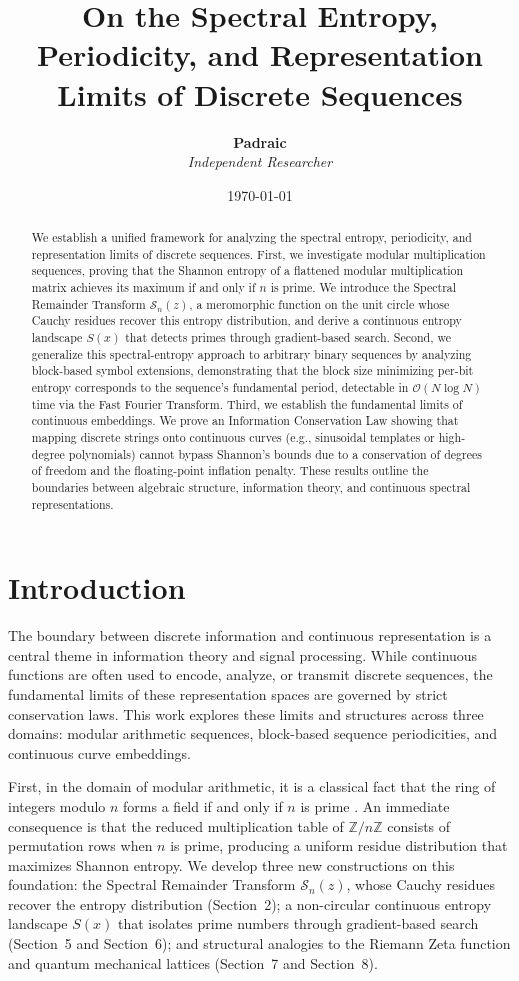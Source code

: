 \documentclass[11pt,twoside]{article}
\title{\textbf{On the Spectral Entropy, Periodicity, and Representation Limits of Discrete Sequences}}
\author{\textbf{Padraic} \\ \textit{Independent Researcher}}
\date{\today}
\begin{document}
	
	\maketitle
	
	\begin{abstract}
		We establish a unified framework for analyzing the spectral entropy, periodicity, and representation limits of discrete sequences. First, we investigate modular multiplication sequences, proving that the Shannon entropy of a flattened modular multiplication matrix achieves its maximum if and only if $n$ is prime. We introduce the Spectral Remainder Transform $\mathcal{S}_n(z)$, a meromorphic function on the unit circle whose Cauchy residues recover this entropy distribution, and derive a continuous entropy landscape $S(x)$ that detects primes through gradient-based search. Second, we generalize this spectral-entropy approach to arbitrary binary sequences by analyzing block-based symbol extensions, demonstrating that the block size minimizing per-bit entropy corresponds to the sequence's fundamental period, detectable in $\mathcal{O}(N \log N)$ time via the Fast Fourier Transform. Third, we establish the fundamental limits of continuous embeddings. We prove an Information Conservation Law showing that mapping discrete strings onto continuous curves (e.g., sinusoidal templates or high-degree polynomials) cannot bypass Shannon's bounds due to a conservation of degrees of freedom and the floating-point inflation penalty. These results outline the boundaries between algebraic structure, information theory, and continuous spectral representations.
	\end{abstract}
	
	\section{Introduction}
	The boundary between discrete information and continuous representation is a central theme in information theory and signal processing. While continuous functions are often used to encode, analyze, or transmit discrete sequences, the fundamental limits of these representation spaces are governed by strict conservation laws. This work explores these limits and structures across three domains: modular arithmetic sequences, block-based sequence periodicities, and continuous curve embeddings.
	
	First, in the domain of modular arithmetic, it is a classical fact that the ring of integers modulo $n$ forms a field if and only if $n$ is prime \cite{ireland_rosen}. An immediate consequence is that the reduced multiplication table of $\mathbb{Z}/n\mathbb{Z}$ consists of permutation rows when $n$ is prime, producing a uniform residue distribution that maximizes Shannon entropy. We develop three new constructions on this foundation: the Spectral Remainder Transform $\mathcal{S}_n(z)$, whose Cauchy residues recover the entropy distribution (Section~2); a non-circular continuous entropy landscape $S(x)$ that isolates prime numbers through gradient-based search (Section~5 and Section~6); and structural analogies to the Riemann Zeta function and quantum mechanical lattices (Section~7 and Section~8).
	
\end{document}
